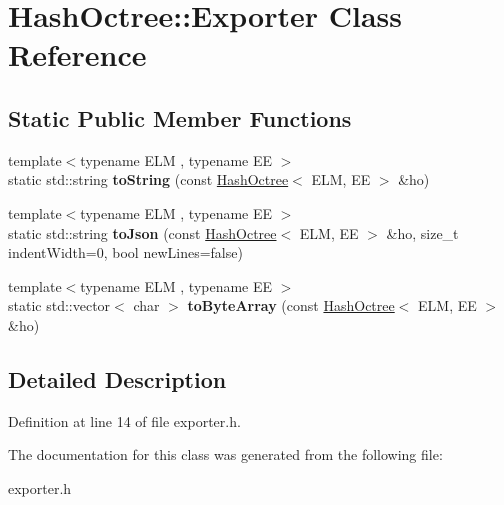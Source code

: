 \hypertarget{class_hash_octree_1_1_exporter}{}\section{Hash\+Octree\+::Exporter Class Reference}
\label{class_hash_octree_1_1_exporter}
\subsection*{Static Public Member Functions}
\begin{DoxyCompactItemize}
\item 
\mbox{\label{class_hash_octree_1_1_exporter_a693b97ba4cd6e0df193591a917372d30}} 
{\footnotesize template$<$typename E\+LM , typename EE $>$ }\\static std\+::string {\bfseries to\+String} (const \mbox{\hyperlink{class_hash_octree_1_1_hash_octree}{Hash\+Octree}}$<$ E\+LM, EE $>$ \&ho)
\item 
\mbox{\label{class_hash_octree_1_1_exporter_a7b05477689e2207ab443fc47814dd947}} 
{\footnotesize template$<$typename E\+LM , typename EE $>$ }\\static std\+::string {\bfseries to\+Json} (const \mbox{\hyperlink{class_hash_octree_1_1_hash_octree}{Hash\+Octree}}$<$ E\+LM, EE $>$ \&ho, size\+\_\+t indent\+Width=0, bool new\+Lines=false)
\item 
\mbox{\label{class_hash_octree_1_1_exporter_a37c03bb9572a0ae2c9dfc795c3dc2472}} 
{\footnotesize template$<$typename E\+LM , typename EE $>$ }\\static std\+::vector$<$ char $>$ {\bfseries to\+Byte\+Array} (const \mbox{\hyperlink{class_hash_octree_1_1_hash_octree}{Hash\+Octree}}$<$ E\+LM, EE $>$ \&ho)
\end{DoxyCompactItemize}


\subsection{Detailed Description}


Definition at line 14 of file exporter.\+h.



The documentation for this class was generated from the following file\+:\begin{DoxyCompactItemize}
\item 
exporter.\+h\end{DoxyCompactItemize}
